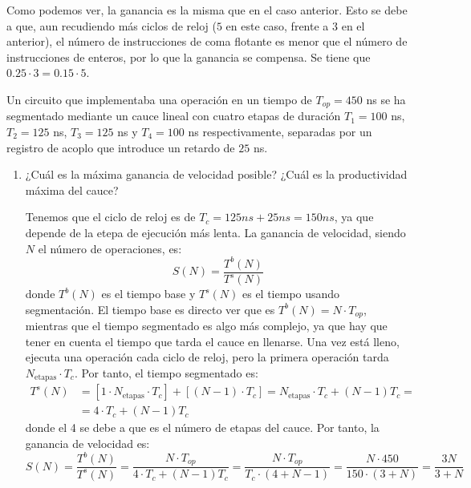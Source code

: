 \begin{ejercicio}
\begin{enumerate}
        Como podemos ver, la ganancia es la misma que en el caso anterior. Esto se debe a que, aun recudiendo más ciclos de reloj ($5$ en este caso, frente a $3$ en el anterior),
        el número de instrucciones de coma flotante es menor que el número de instrucciones de enteros, por lo que la ganancia se compensa.
        Se tiene que $0.25 \cdot 3 = 0.15 \cdot 5$.
    \end{enumerate}
\end{ejercicio}

\begin{ejercicio}
    Un circuito que implementaba una operación en un tiempo de $T_{op}=450$ ns se ha segmentado
    mediante un cauce lineal con cuatro etapas de duración $T_1=100$ ns, $T_2=125$ ns, $T_3=125$ ns y
    $T_4=100$ ns respectivamente, separadas por un registro de acoplo que introduce un retardo de
    $25$ ns.
    \begin{enumerate}
        \item ¿Cuál es la máxima ganancia de velocidad posible? ¿Cuál es la productividad máxima
        del cauce?

        Tenemos que el ciclo de reloj es de $T_c = 125ns + 25ns = 150ns$, ya que depende de la etepa de ejecución más lenta.
        La ganancia de velocidad, siendo $N$ el número de operaciones, es:
        \begin{equation*}
            S(N) = \frac{T^b(N)}{T^s(N)} 
        \end{equation*}
        donde $T^b(N)$ es el tiempo base y $T^s(N)$ es el tiempo usando segmentación.
        El tiempo base es directo ver que es $T^b(N) = N\cdot T_{op}$, mientras que el tiempo segmentado es algo más complejo,
        ya que hay que tener en cuenta el tiempo que tarda el cauce en llenarse.
        Una vez está lleno, ejecuta una operación cada ciclo de reloj, pero la primera operación
        tarda $N_{\text{etapas}} \cdot T_c$. Por tanto, el tiempo segmentado es:
        \begin{align*}
            T^s(N) &= \left[1\cdot N_{\text{etapas}} \cdot T_c\right] + \left[(N-1)\cdot T_c\right]
            = N_{\text{etapas}} \cdot T_c + (N-1)T_c
            =\\&= 4 \cdot T_c + (N-1)T_c
        \end{align*}
        donde el 4 se debe a que es el número de etapas del cauce. Por tanto, la ganancia de velocidad es:
        \begin{equation*}
            S(N) = \frac{T^b(N)}{T^s(N)}
            = \frac{N\cdot T_{op}}{4\cdot T_c + (N-1)T_c}
            = \frac{N\cdot T_{op}}{T_c\cdot (4 + N-1)}
            = \frac{N\cdot 450}{150 \cdot (3+N)}
            = \frac{3N}{3+N}
        \end{equation*}
        

\end{enumerate}
\end{ejercicio}
